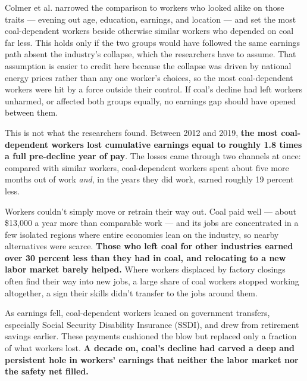 \documentclass[
  11pt,
]{article}
\newcommand{\sectionhead}[1]{%
  \vspace{2pt}{\color{ink}\bfseries\fontsize{9.75pt}{12pt}\selectfont
  \textls[20]{\MakeUppercase{#1}}\par}\vspace{1pt}}
\begin{document}
\noindent Colmer et al. narrowed the comparison to workers who looked alike on those traits --- evening out age, education, earnings, and location --- and set the most coal-dependent workers beside otherwise similar workers who depended on coal far less. This holds only if the two groups would have followed the same earnings path absent the industry's collapse, which the researchers have to assume. That assumption is easier to credit here because the collapse was driven by national energy prices rather than any one worker's choices, so the most coal-dependent workers were hit by a force outside their control. If coal's decline had left workers unharmed, or affected both groups equally, no earnings gap should have opened between them.

\vspace{6pt}

\sectionhead{What the study found}
\noindent This is not what the researchers found. Between 2012 and 2019, \textbf{the most coal-dependent workers lost cumulative earnings equal to roughly 1.8 times a full pre-decline year of pay}. The losses came through two channels at once: compared with similar workers, coal-dependent workers spent about five more months out of work \textit{and}, in the years they did work, earned roughly 19 percent less.

\noindent Workers couldn't simply move or retrain their way out. Coal paid well --- about \$13,000 a year more than comparable work --- and its jobs are concentrated in a few isolated regions where entire economies lean on the industry, so nearby alternatives were scarce. \textbf{Those who left coal for other industries earned over 30 percent less than they had in coal, and relocating to a new labor market barely helped.} Where workers displaced by factory closings often find their way into new jobs, a large share of coal workers stopped working altogether, a sign their skills didn't transfer to the jobs around them.

\noindent As earnings fell, coal-dependent workers leaned on government transfers, especially Social Security Disability Insurance (SSDI), and drew from retirement savings earlier. These payments cushioned the blow but replaced only a fraction of what workers lost. \textbf{A decade on, coal's decline had carved a deep and persistent hole in workers' earnings that neither the labor market nor the safety net filled.}
\end{document}
